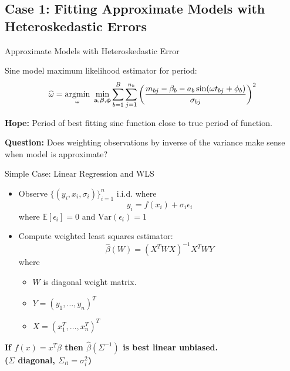 \documentclass[12pt]{beamer}
\newcommand{\argmin}[1]{\underset{#1}{\operatorname{argmin}}\text{ }}
\newcommand{\Var}{\text{Var}}
\newcommand{\E}{\mathbb{E}}
\newcommand{\V}[1]{{\bm{\mathbf{\MakeLowercase{#1}}}}} %
\begin{document}
\subsection{Case 1: Fitting Approximate Models with Heteroskedastic Errors}

\begin{frame}{Approximate Models with Heteroskedastic Error}

  Sine model maximum likelihood estimator for period:
  \begin{equation*}
    \widehat{\omega} = \argmin{\omega} \min_{\V{a},\V{\beta},\V{\phi}} \sum_{b=1}^B \sum_{j=1}^{n_b} \left(\frac{m_{bj} - \beta_{b} - a_b\sin(\omega t_{bj} + \phi_b)}{\sigma_{bj}}\right)^2
  \end{equation*}
  
  
  \textbf{Hope:} Period of best fitting sine function close to true period of function.\\

  \vspace{.2in}

  \textbf{Question:} Does weighting observations by inverse of the variance make sense when model is approximate?
  
\end{frame}

\begin{frame}{Simple Case: Linear Regression and WLS}
\begin{itemize}
\item Observe $\{(y_i,x_i,\sigma_i)\}_{i=1}^n$ i.i.d. where
  \begin{equation*}
    y_i = f(x_i) + \sigma_i\epsilon_i 
  \end{equation*}
  where $\E[\epsilon_i] = 0$  and $\Var(\epsilon_i) = 1$
\item Compute weighted least squares estimator:
  \begin{equation*}
    \widehat{\beta}(W) = (X^TWX)^{-1}X^TWY
  \end{equation*}
  where
  \begin{itemize}
    \item $W$ is diagonal weight matrix.
    \item $Y = (y_1,\ldots,y_n)^T$
    \item $X = (x_1^T,\ldots,x_n^T)^T$
  \end{itemize}
\end{itemize}

\begin{center}
\textbf{If $f(x) = x^T\beta$ then $\widehat{\beta}(\Sigma^{-1})$ is best linear unbiased.\\ ($\Sigma$ diagonal, $\Sigma_{ii} = \sigma_i^2$)}
\end{center}
\end{frame}
\end{document}
